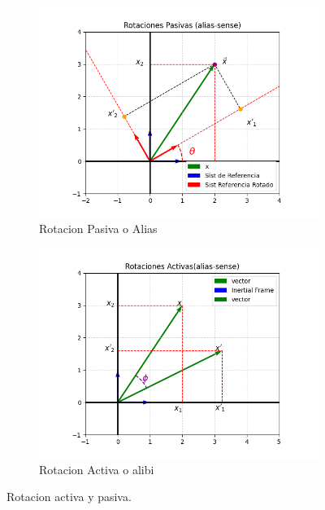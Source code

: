 \begin{figure}[!htpb]

	\begin{subfigure}[b]{0.49\linewidth}
		\includegraphics[width=\linewidth,height=0.25\textheight]{./Figures/PasiveRot.png}

		\caption{Rotacion Pasiva o Alias}
		\label{fig:rotPas}
	\end{subfigure}
	\hfill
	\begin{subfigure}[b]{0.49\linewidth}
		\includegraphics[width=\linewidth, height=0.25\textheight]{./Figures/ActiveRot.png}

		\caption{Rotacion Activa o alibi}
		\label{fig:rotAct}
	\end{subfigure}
	\caption{Rotacion activa y pasiva.}
	\label{fig:cmp_act_vs_rot}
\end{figure}

